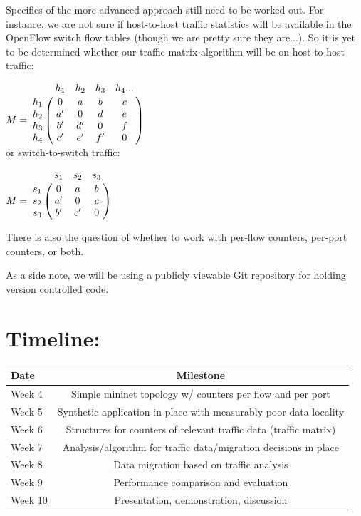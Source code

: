 \documentclass[12pt]{article}
\begin{document}
Specifics of the more advanced approach still need to be worked out.  For instance, we are not sure if host-to-host
traffic statistics will be available in the OpenFlow switch flow tables (though we are pretty sure they
are...).  So it is yet to be determined whether our traffic matrix algorithm will be on host-to-host
traffic:

$
M = \bordermatrix{~ & h_1 & h_2 & h_3 & h_4 ... \cr
                  h_1 & 0 & a & b & c\cr
                  h_2 & a' & 0 & d & e\cr
                  h_3 & b' & d' & 0 & f\cr
                  h_4 & c' & e' & f' & 0\cr}
\vspace{5mm}
$
\\
\vspace{3mm}
\noindent or switch-to-switch traffic:

$
M = \bordermatrix{~ & s_1 & s_2 & s_3 \cr
                  s_1 & 0  & a & b \cr
                  s_2 & a' & 0 & c \cr
                  s_3 & b' & c' & 0 \cr}
$
\\
\vspace{3mm}

There is also the question of whether to work with per-flow counters, per-port counters, or both.

As a side note, we will be using a publicly viewable Git repository for holding version controlled code.

\vspace{10mm}

\section*{Timeline:}
\label{timeline}
\begin{center}
  \begin{tabular}{ l || c }
    \hline
    Date & Milestone \\ \hline \hline
    Week 4  & Simple mininet topology w/ counters per flow and per port \\ \hline
    Week 5  & Synthetic application in place with measurably poor data locality \\ \hline
    Week 6  & Structures for counters of relevant traffic data (traffic matrix) \\ \hline
    Week 7  & Analysis/algorithm for traffic data/migration decisions in place \\ \hline
    Week 8  & Data migration based on traffic analysis \\ \hline
    Week 9  & Performance comparison and evaluation \\ \hline
    Week 10 & Presentation, demonstration, discussion \\ 
    \hline
  \end{tabular}
\end{center}
\end{document}
